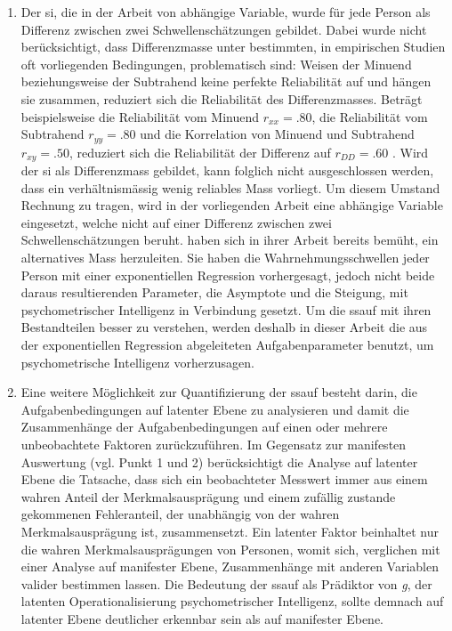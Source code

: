 \documentclass[11pt, twoside, a4paper]{book}		%
\begin{document}
\begin{enumerate}
	\item Der \gls{si}, die in der Arbeit von \citet{Melnick2013} abhängige Variable, wurde für jede Person als Differenz zwischen zwei Schwellenschätzungen gebildet. Dabei wurde nicht berücksichtigt, dass Differenzmasse unter bestimmten, in empirischen Studien oft vorliegenden Bedingungen, problematisch sind: Weisen der Minuend  beziehungsweise der Subtrahend keine perfekte Reliabilität auf und hängen sie zusammen, reduziert sich die Reliabilität des Differenzmasses. Beträgt beispielsweise die Reliabilität vom Minuend $r_{xx} = .80$, die Reliabilität vom Subtrahend $r_{yy} = .80$ und die Korrelation von Minuend und Subtrahend $r_{xy} = .50$, reduziert sich die Reliabilität der Differenz auf $r_{DD} = .60$ \citep[][ S. 145]{Murphy2005}. Wird der \gls{si} als Differenzmass gebildet, kann folglich nicht ausgeschlossen werden, dass ein verhältnismässig wenig reliables Mass vorliegt. Um diesem Umstand Rechnung zu tragen, wird in der vorliegenden Arbeit eine abhängige Variable eingesetzt, welche nicht auf einer Differenz zwischen zwei Schwellenschätzungen beruht. \citeauthor{Melnick2013} haben sich in ihrer Arbeit bereits bemüht, ein alternatives Mass herzuleiten. Sie haben die Wahrnehmungsschwellen jeder Person mit einer exponentiellen Regression vorhergesagt, jedoch nicht beide daraus resultierenden Parameter, die Asymptote und die Steigung, mit psychometrischer Intelligenz in Verbindung gesetzt. Um die \gls{ssauf} mit ihren Bestandteilen besser zu verstehen, werden deshalb in dieser Arbeit die aus der exponentiellen Regression abgeleiteten Aufgabenparameter benutzt, um psychometrische Intelligenz vorherzusagen.

	\item \label{text:Fragestellung3} Eine weitere Möglichkeit zur Quantifizierung der \gls{ssauf} besteht darin, die Aufgabenbedingungen auf latenter Ebene zu analysieren und damit die Zusammenhänge der Aufgabenbedingungen auf einen oder mehrere unbeobachtete Faktoren zurückzuführen. Im Gegensatz zur manifesten Auswertung (vgl. Punkt 1 und 2) berücksichtigt die Analyse auf latenter Ebene die Tatsache, dass sich ein beobachteter Messwert immer aus einem wahren Anteil der Merkmalsausprägung und einem zufällig zustande gekommenen Fehleranteil, der unabhängig von der wahren Merkmalsausprägung ist, zusammensetzt. Ein latenter Faktor beinhaltet nur die wahren Merkmalsausprägungen von Personen, womit sich, verglichen mit einer Analyse auf manifester Ebene, Zusammenhänge mit anderen Variablen valider bestimmen lassen. Die Bedeutung der \gls{ssauf} als Prädiktor von \textit{g}, der latenten Operationalisierung psychometrischer Intelligenz, sollte demnach auf latenter Ebene deutlicher erkennbar sein als auf manifester Ebene.


\end{enumerate}
\end{document}
